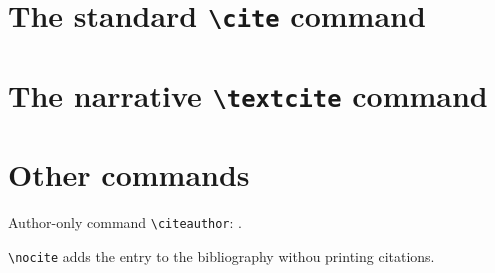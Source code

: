 \documentclass{article}
\newcommand\cs[1]{\texttt{\textbackslash #1}}
\begin{document}
\section*{The standard \cs{cite} command}

\cite{ITEM-1}

\cite{ITEM-1, ITEM-2}

\cite[page = 42]{ITEM-1}

\cite[prefix = {see }]{ITEM-1}

\cite[prefix = {see }, page = 42--73]{ITEM-1}


\section*{The narrative \cs{textcite} command}

\textcite{ITEM-1}

\textcite[page = 42]{ITEM-1}

\textcite[infix = {'s early work}]{ITEM-1}

\textcite[prefix = {see }]{ITEM-1}

\textcite[prefix = {see }, page = 42--73]{ITEM-1}


\section*{Other commands}

Author-only command \cs{citeauthor}: \citeauthor{ITEM-1}.

\cs{nocite} adds the entry to the bibliography withou printing citations.\nocite{ITEM-3}

\printbibliography
\end{document}
